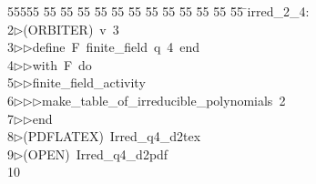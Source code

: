 %
%
\begin{tabbing}
55555 \= 55 \= 55 \= 55 \= 55 \= 55 \= 55 \= 55 \= 55 \= 55 \= 55 \= 55 \= 55 \= \>irred\_2\_4:\\[0pt]
2\>$\triangleright$\>(ORBITER)\ v\ 3\ \\[0pt]
3\>$\triangleright$\>$\triangleright$\>define\ F\ finite\_field\ q\ 4\ end\ \\[0pt]
4\>$\triangleright$\>$\triangleright$\>with\ F\ do\ \\[0pt]
5\>$\triangleright$\>$\triangleright$\>finite\_field\_activity\ \\[0pt]
6\>$\triangleright$\>$\triangleright$\>$\triangleright$\>make\_table\_of\_irreducible\_polynomials\ 2\ \\[0pt]
7\>$\triangleright$\>$\triangleright$\>end\\[0pt]
8\>$\triangleright$\>(PDFLATEX)\ Irred\_q4\_d2tex\\[0pt]
9\>$\triangleright$\>(OPEN)\ Irred\_q4\_d2pdf\\[0pt]
10\>\end{tabbing}
